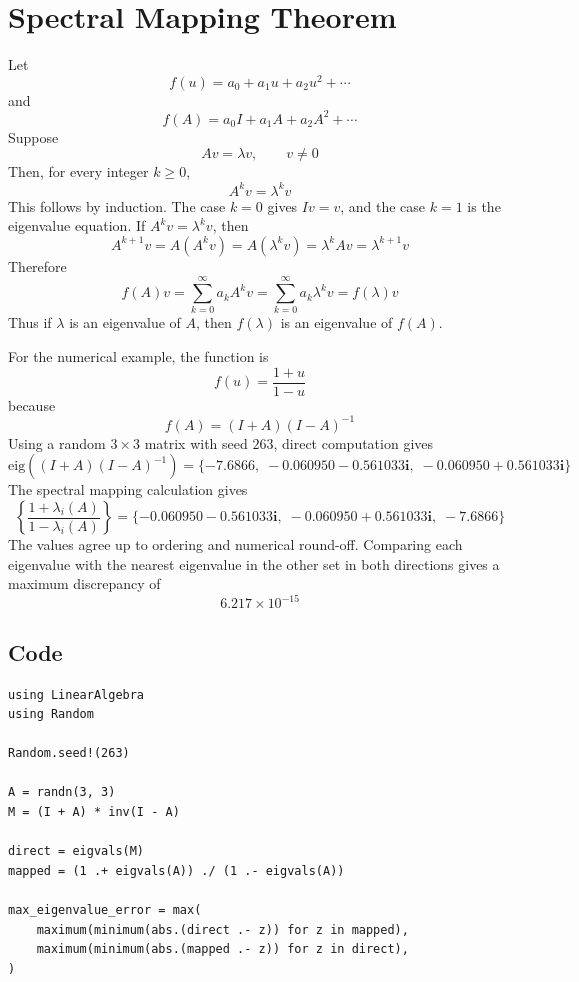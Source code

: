 \section{Spectral Mapping Theorem}

Let
\[
f(u)=a_0+a_1u+a_2u^2+\cdots
\]
and
\[
f(A)=a_0I+a_1A+a_2A^2+\cdots
\]
Suppose
\[
Av=\lambda v,\qquad v\ne 0
\]
Then, for every integer \(k\ge 0\),
\[
A^k v=\lambda^k v
\]
This follows by induction. The case \(k=0\) gives \(Iv=v\), and the case \(k=1\) is the eigenvalue equation. If \(A^k v=\lambda^k v\), then
\[
A^{k+1}v=A(A^k v)=A(\lambda^k v)=\lambda^k Av=\lambda^{k+1}v
\]
Therefore
\[
f(A)v
=
\sum_{k=0}^{\infty} a_k A^k v
=
\sum_{k=0}^{\infty} a_k \lambda^k v
=
f(\lambda)v
\]
Thus if \(\lambda\) is an eigenvalue of \(A\), then \(f(\lambda)\) is an eigenvalue of \(f(A)\).

For the numerical example, the function is
\[
f(u)=\frac{1+u}{1-u}
\]
because
\[
f(A)=(I+A)(I-A)^{-1}
\]
Using a random \(3\times 3\) matrix with seed \(263\), direct computation gives
\[
\mathrm{eig}((I+A)(I-A)^{-1})
=
\{-7.6866,\;-0.060950-0.561033\mathbf{i},\;-0.060950+0.561033\mathbf{i}\}
\]
The spectral mapping calculation gives
\[
\left\{\frac{1+\lambda_i(A)}{1-\lambda_i(A)}\right\}
=
\{-0.060950-0.561033\mathbf{i},\;-0.060950+0.561033\mathbf{i},\;-7.6866\}
\]
The values agree up to ordering and numerical round-off. Comparing each eigenvalue with
the nearest eigenvalue in the other set in both directions gives a maximum discrepancy of
\[
6.217\times 10^{-15}
\]

\subsection{Code}
\begin{lstlisting}[language={}]
using LinearAlgebra
using Random

Random.seed!(263)

A = randn(3, 3)
M = (I + A) * inv(I - A)

direct = eigvals(M)
mapped = (1 .+ eigvals(A)) ./ (1 .- eigvals(A))

max_eigenvalue_error = max(
    maximum(minimum(abs.(direct .- z)) for z in mapped),
    maximum(minimum(abs.(mapped .- z)) for z in direct),
)
\end{lstlisting}
